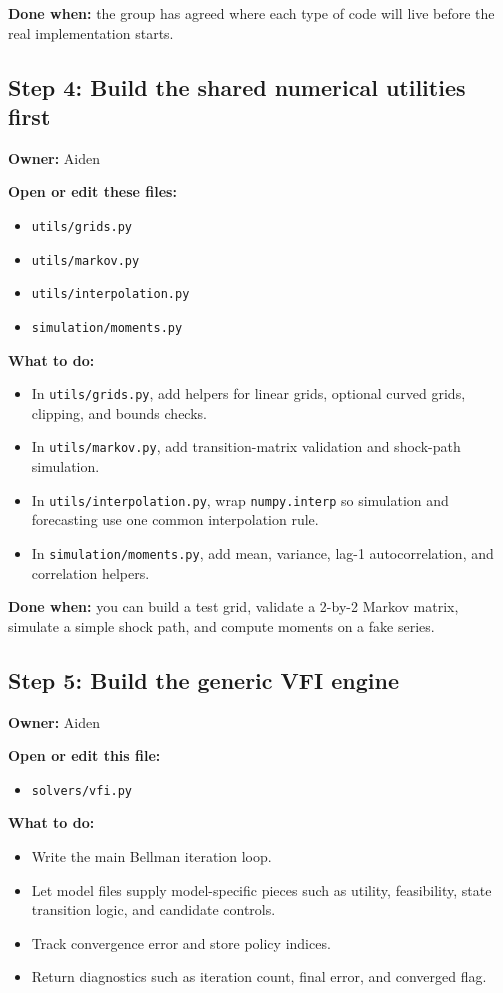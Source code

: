 \documentclass[11pt]{article}
\begin{document}
\textbf{Done when:} the group has agreed where each type of code will live before the real implementation starts.

\subsection{Step 4: Build the shared numerical utilities first}
\textbf{Owner:} Aiden

\textbf{Open or edit these files:}
\begin{itemize}
    \item \texttt{utils/grids.py}
    \item \texttt{utils/markov.py}
    \item \texttt{utils/interpolation.py}
    \item \texttt{simulation/moments.py}
\end{itemize}

\textbf{What to do:}
\begin{itemize}
    \item In \texttt{utils/grids.py}, add helpers for linear grids, optional curved grids, clipping, and bounds checks.
    \item In \texttt{utils/markov.py}, add transition-matrix validation and shock-path simulation.
    \item In \texttt{utils/interpolation.py}, wrap \texttt{numpy.interp} so simulation and forecasting use one common interpolation rule.
    \item In \texttt{simulation/moments.py}, add mean, variance, lag-1 autocorrelation, and correlation helpers.
\end{itemize}

\textbf{Done when:} you can build a test grid, validate a 2-by-2 Markov matrix, simulate a simple shock path, and compute moments on a fake series.

\subsection{Step 5: Build the generic VFI engine}
\textbf{Owner:} Aiden

\textbf{Open or edit this file:}
\begin{itemize}
    \item \texttt{solvers/vfi.py}
\end{itemize}

\textbf{What to do:}
\begin{itemize}
    \item Write the main Bellman iteration loop.
    \item Let model files supply model-specific pieces such as utility, feasibility, state transition logic, and candidate controls.
    \item Track convergence error and store policy indices.
    \item Return diagnostics such as iteration count, final error, and converged flag.
\end{itemize}
\end{document}
